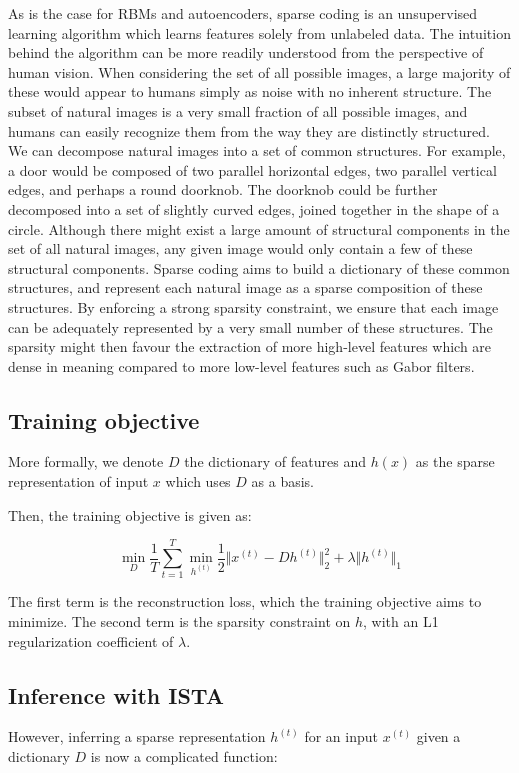 \documentclass{article} %
\begin{document}
As is the case for RBMs and autoencoders, sparse coding is an unsupervised learning algorithm which learns features solely from unlabeled data. The intuition behind the algorithm can be more readily understood from the perspective of human vision. When considering the set of all possible images, a large majority of these would appear to humans simply as noise with no inherent structure. The subset of natural images is a very small fraction of all possible images, and humans can easily recognize them from the way they are distinctly structured. We can decompose natural images into a set of common structures. For example, a door would be composed of two parallel horizontal edges, two parallel vertical edges, and perhaps a round doorknob. The doorknob could be further decomposed into a set of slightly curved edges, joined together in the shape of a circle. Although there might exist a large amount of structural components in the set of all natural images, any given image would only contain a few of these structural components. Sparse coding aims to build a dictionary of these common structures, and represent each natural image as a sparse composition of these structures. By enforcing a strong sparsity constraint, we ensure that each image can be adequately represented by a very small number of these structures. The sparsity might then favour the extraction of more high-level features which are dense in meaning compared to more low-level features such as Gabor filters.

\subsection{Training objective}
More formally, we denote $D$ the dictionary of features and $h(x)$ as the sparse representation of input $x$ which uses $D$ as a basis.

Then, the training objective is given as:

\begin{equation}
\min_{D} \frac{1}{T} \sum_{t=1}^{T} \min_{h^{(t)}} \frac{1}{2} \Vert x^{(t)} - D h^{(t)} \Vert_{2}^{2} + \lambda \Vert h^{(t)} \Vert_{1}
\end{equation}

The first term is the reconstruction loss, which the training objective aims to minimize. The second term is the sparsity constraint on $h$, with an L1 regularization coefficient of $\lambda$.

\subsection{Inference with ISTA}
However, inferring a sparse representation $h^{(t)}$ for an input $x^{(t)}$ given a dictionary $D$ is now a complicated function:
\end{document}
